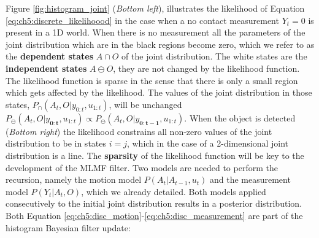 %

Figure \ref{fig:histogram_joint} (\textit{Bottom left}), illustrates the likelihood of Equation \ref{eq:ch5:discrete_likelihoood} 
in the case when a no contact measurement $Y_t=0$ is present in a 1D world. When there is no measurement all the parameters of the 
joint distribution which are in the black regions become zero, which we refer to as the \textbf{dependent states} $A \cap O$ of the joint 
distribution. The white states are the \textbf{independent states} $A \ominus O$, they are not changed by the likelihood function.
The likelihood  function is sparse in the sense that there is only a small  region which gets affected by the likelihood.
The values of the joint distribution in those states, $P_{\cap}(A_t,O|y_{0:t},u_{1:t})$, will be unchanged 
${P_{\ominus}(A_t,O|y_\mathbf{{0:t}},u_{1:t}) \propto P_{\ominus}(A_t,O|y_\mathbf{{0:t-1}},u_{1:t})}$. 
When the object is detected (\textit{Bottom right}) the likelihood constrains all non-zero values of the joint 
distribution to be in states $i = j$, which in the case of a 2-dimensional joint 
distribution is a line. The \textbf{sparsity} of the likelihood function  will be key to the development of the MLMF filter.
Two models are needed to perform the recursion, namely the motion model $P(A_t|A_{t-1},u_t)$ and the measurement model
$P(Y_t|A_t,O)$, which we already detailed. Both models applied consecutively to the initial joint distribution results in a posterior
distribution. Both Equation \ref{eq:ch5:disc_motion}-\ref{eq:ch5:disc_measurement} are part of the histogram Bayesian filter 
update:


\begin{center}
%
\end{center}

